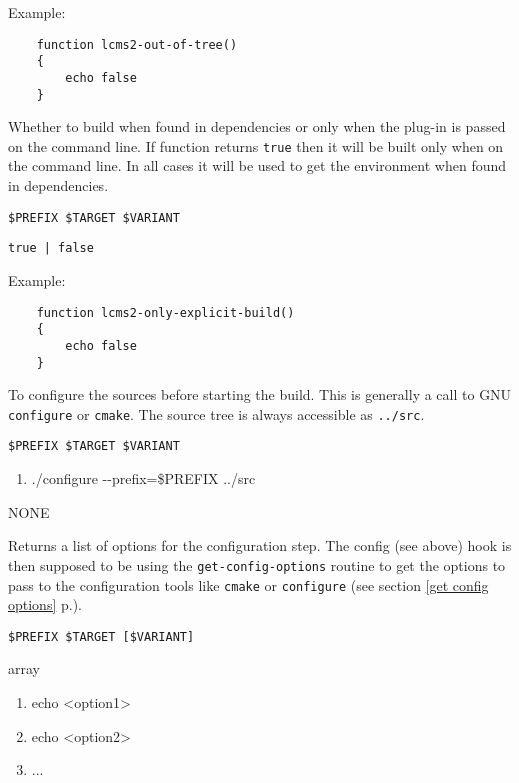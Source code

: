 \documentclass[a4paper,12pt,twoside]{article}
\newcommand{\code}[1]{\texttt{#1}}
\newcommand{\seeref}[1]{see section \ref{#1} p.\pageref{#1}}
\newcommand{\ddash}{-{}-}
\begin{document}
\begin{description}[font=\large\texttt]
	Example:
	\begin{lstlisting}
	function lcms2-out-of-tree()
	{
		echo false
	}
	\end{lstlisting}

	\item[<module>{[}-<variant>{]}-only-explicit-build] Whether to build when found in dependencies or only when the plug-in is passed on the command line. If function returns \code{true} then it will be built only when on the command line. In all cases it will be used to get the environment when found in dependencies.
	\begin{description}[font=\textit,style=standard]
		\item[parameter] \tabto{2cm} \code{\$PREFIX \$TARGET \$VARIANT}
		\item[return] \tabto{2cm} \code{true | false}
	\end{description}

	Example:
	\begin{lstlisting}
	function lcms2-only-explicit-build()
	{
		echo false
	}
	\end{lstlisting}

	\item[<module>{[}-<variant>{]}-config] To configure the sources before starting the build. This is generally a call to GNU \code{configure} or \code{cmake}. The source tree is always accessible as \code{../src}.
	\begin{description}[font=\textit,style=standard]
		\item[parameter] \tabto{2cm} \code{\$PREFIX \$TARGET \$VARIANT}
		\begin{enumerate}
			\item ./configure \ddash{}prefix=\$PREFIX ../src
		\end{enumerate}
		\item[return] \tabto{2cm} NONE
	\end{description}

	\item[<module>{[}-common|<variant>{]}-config-options] Returns a list of options for the configuration step. The config (see above) hook is then supposed to be using the \code{get-config-options} routine to get the options to pass to the configuration tools like \code{cmake} or \code{configure} (\seeref{get config options}).
	\begin{description}[font=\textit,style=standard]
		\item[parameter] \tabto{2cm} \code{\$PREFIX \$TARGET [\$VARIANT]}
		\item[return] \tabto{2cm} array
		\begin{enumerate}
			\item echo <option1>
			\item echo <option2>
			\item ...
		\end{enumerate}
	\end{description}


\end{description}
\end{document}
